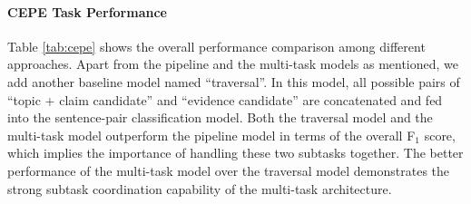 \documentclass[11pt]{article}
\begin{document}
\paragraph{CEPE Task Performance}
Table \ref{tab:cepe} shows the overall performance comparison among different approaches.
Apart from the pipeline and the multi-task models as mentioned, we add another baseline model named ``traversal''.
In this model, all possible pairs of  ``topic + claim candidate''
and ``evidence candidate'' 
are concatenated and fed into the sentence-pair classification model.
Both the traversal model and the multi-task model outperform the pipeline model in terms of the overall F$_1$ score, which implies the importance of handling these two subtasks together.
The better performance of the multi-task model over the traversal model demonstrates the strong subtask coordination capability of the multi-task architecture. 




\begin{table}[t!]
	\centering
{}
\caption{Examples of model predictions for CEPE task.
PL stands for the pipeline, and MT stands for the multi-task. 
    We select four sentences from the evidence candidates to demonstrate the prediction results here.}
	\label{tab:casestudy}
\end{table}
        
\end{document}
